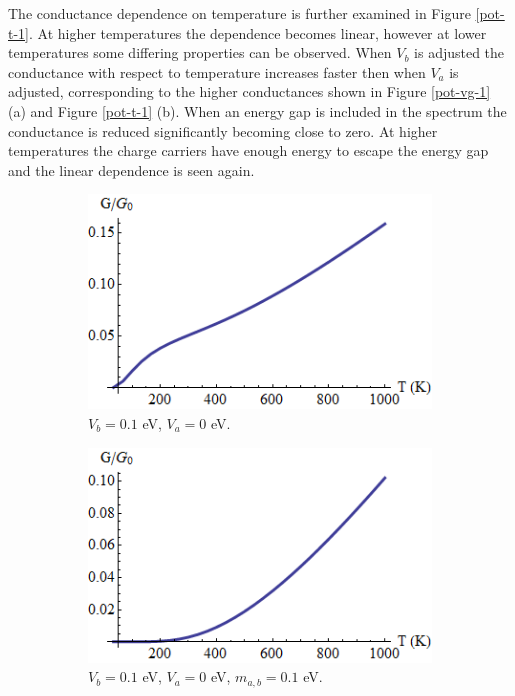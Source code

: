 \documentclass[12pt,a4paper]{report}
\begin{document}
	The conductance dependence on temperature is further examined in Figure \ref{pot-t-1}. At higher temperatures the dependence becomes linear, however at lower temperatures some differing properties can be observed. When $V_{b}$ is adjusted the conductance with respect to temperature increases faster then when $V_{a}$ is adjusted, corresponding to the higher conductances shown in Figure \ref{pot-vg-1} (a) and Figure \ref{pot-t-1} (b). When an energy gap is included in the spectrum the conductance is reduced significantly becoming close to zero. At higher temperatures the charge carriers have enough energy to escape the energy gap and the linear dependence is seen again.
		\begin{figure}[h]
			 \begin{subfigure}[h]{0.3\textwidth}
				\centerline{\includegraphics[scale=0.35]{images/pot-t-1}}
				\caption{$V_{b}=0.1$ eV, $V_{a}=0$ eV.}
			\end{subfigure}
			\hspace{0.5cm}
			\begin{subfigure}[h]{0.3\textwidth}
				\centerline{\includegraphics[scale=0.35]{images/pot-t-2}}
				\caption{$V_{b}=0.1$ eV, $V_{a}=0$ eV, $m_{a,b}=0.1$ eV.}
			\end{subfigure}
			\hspace{0.5cm}
			\begin{subfigure}[h]{0.3\textwidth}

\end{subfigure}
\end{figure}
\end{document}
